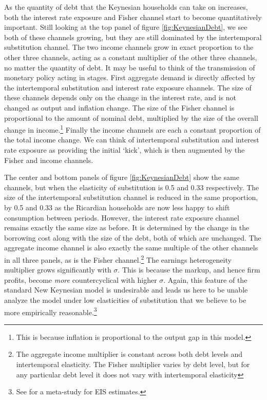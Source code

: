 \documentclass[titlepage]{\econtex}\newcommand{\texname}{ConsumptionHeterogeneity}
\begin{document}
As the quantity of debt that the Keynesian households can take on increases, both the interest rate exposure and Fisher channel start to become quantitatively important. Still looking at the top panel of figure \ref{fig:KeynesianDebt}, we see both of these channels growing, but they are still dominated by the intertemporal substitution channel. The two income channels grow in exact proportion to the other three channels, acting as a constant multiplier of the other three channels, no matter the quantity of debt. It may be useful to think of the transmission of monetary policy acting in stages. First aggregate demand is directly affected by the intertemporal substitution and interest rate exposure channels. The size of these channels depends only on the change in the interest rate, and is not changed as output and inflation change. The size of the Fisher channel is proportional to the amount of nominal debt, multiplied by the size of the overall change in income.\footnote{This is because inflation is proportional to the output gap in this model.} Finally the income channels are each a constant proportion of the total income change. We can think of intertemporal substitution and interest rate exposure as providing the initial `kick', which is then augmented by the Fisher and income channels.

The center and bottom panels of figure \ref{fig:KeynesianDebt} show the same channels, but when the elasticity of substitution is 0.5 and 0.33 respectively. The size of the intertemporal substitution channel is reduced in the same proportion, by 0.5 and 0.33 as the Ricardian households are now less happy to shift consumption between periods. However, the interest rate exposure channel remains exactly the same size as before. It is determined by the change in the borrowing cost along with the size of the debt, both of which are unchanged. The aggregate income channel is also exactly the same multiple of the other channels in all three panels, as is the Fisher channel.\footnote{The aggregate income multiplier is constant across both debt levels and intertemporal elasticity. The Fisher multiplier varies by debt level, but for any particular debt level it does not vary with intertemporal elasticity} The earnings heterogeneity multiplier grows significantly with $\sigma$. This is because the markup, and hence firm profits, become \textit{more} countercyclical with higher $\sigma$. Again, this feature of the standard New Keynesian model is undesirable and leads us here to be unable analyze the model under low elasticities of substitution that we believe to be more empirically reasonable.\footnote{See \cite{havranek_measuring_2015} for a meta-study for EIS estimates.}
\end{document}
